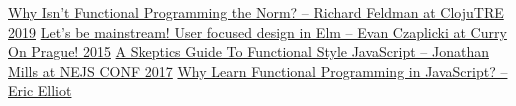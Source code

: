 \documentclass{article}
\begin{document}
\pagebreak
\begin{thebibliography}{99}
   \href{https://youtu.be/QyJZzq0v7Z4}{Why Isn't Functional Programming the Norm? – Richard Feldman at ClojuTRE 2019}
   \href{https://youtu.be/oYk8CKH7OhE?t=2133}{Let's be mainstream! User focused design in Elm – Evan Czaplicki at Curry On Prague! 2015}
   \href{https://youtu.be/oF9XTJoScOE?t=1253}{A Skeptics Guide To Functional Style JavaScript – Jonathan Mills at NEJS CONF 2017}
   \href{https://medium.com/javascript-scene/why-learn-functional-programming-in-javascript-composing-software-ea13afc7a257}{Why Learn Functional Programming in JavaScript? – Eric Elliot}
\end{thebibliography}
\end{document}
